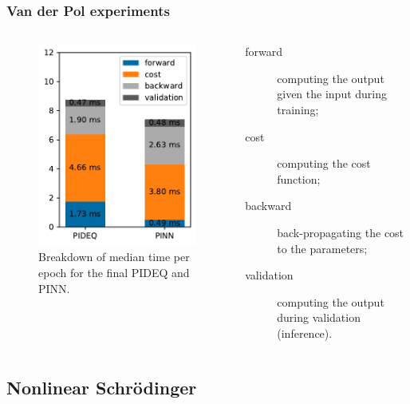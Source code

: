 \documentclass[t]{beamer}
\begin{document}
\begin{frame}
    \frametitle{Van der Pol experiments}
    \begin{columns}[T] 
	\begin{column}{.6\textwidth}
	    \vspace{-10pt}
	    \begin{figure}[h]
	        \centering
		\includegraphics[width=.6\textwidth]{../images/final_times.pdf}
		\caption{Breakdown of median time per epoch for the final PIDEQ and PINN.}
		\label{fig:final-times}
	    \end{figure}
        \end{column}
	\begin{column}{.4\textwidth} 
	    \begin{description}
		\item[\textcolor{tabblue}{forward}] computing the output given the input during training;
		\item[\textcolor{taborange}{cost}] computing the cost function;
		\item[\textcolor{tabgray}{backward}] back-propagating the cost to the parameters;
		\item[\textcolor{tabdarkgray}{validation}] computing the output during validation (inference).
	    \end{description}
	\end{column}
    \end{columns}
    
\end{frame}

\subsection{Nonlinear Schrödinger}
\end{document}
